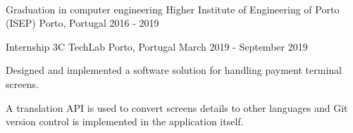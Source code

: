 \documentclass[]{awesome-cv}
\begin{document}
\begin{center}
	  \\
	
\end{center}

\vspace{-2mm}
\begin{cventries}
	\cventry
	{Graduation in computer engineering}
	{Higher Institute of Engineering of Porto (ISEP)}
	{Porto, Portugal}
	{2016 - 2019}
	{}
\end{cventries}

\vspace{-2mm}
\begin{cventries}
	\cventry
	{Internship}
	{3C TechLab}
	{Porto, Portugal}
	{March 2019 - September 2019}
	{\begin{cvitems}
		\item {Designed and implemented a software solution for handling payment terminal screens.}
		\item {A translation API is used to convert screens details to other languages and Git version control is implemented in the application itself.}
	\end{cvitems}}
\end{cventries}
\end{document}
